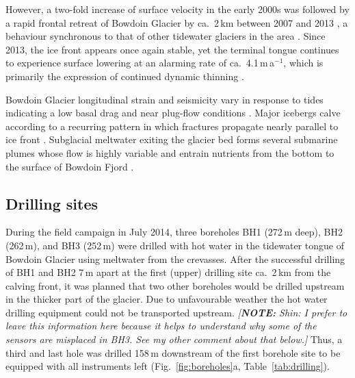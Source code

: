 \documentclass[utf8]{article}
\newcommand{\note}[1]{\textcolor{c0}{\emph{[\textbf{NOTE:} #1]}}}
\begin{document}
    However, a two-fold increase of surface velocity in the early 2000s was
    followed by a rapid frontal retreat of Bowdoin Glacier by ca.~2\,km between
    2007 and 2013 \citep[Fig.~2]{Sugiyama.etal.2015}, a behaviour synchronous
    to that of other tidewater glaciers in the area
    \citep{Sakakibara.Sugiyama.2018}. Since 2013, the ice front appears once
    again stable, yet the terminal tongue continues to experience surface
    lowering at an alarming rate of ca.~4.1\,m\,a$^{-1}$, which is primarily
    the expression of continued dynamic thinning \citep{Tsutaki.etal.2016}.

    Bowdoin Glacier longitudinal strain and seismicity vary in response to
    tides~\citep{Podolskiy.etal.2016, Podolskiy.etal.2017} indicating a low
    basal drag and near plug-flow conditions \citep{Seddik.etal.2019}. Major
    icebergs calve according to a recurring pattern in which fractures
    propagate nearly parallel to ice front \citep{Jouvet.etal.2017}. Subglacial
    meltwater exiting the glacier bed forms several submarine plumes whose flow
    is highly variable \citep{Jouvet.etal.2018} and entrain nutrients from the
    bottom to the surface of Bowdoin Fjord \citep{Kanna.etal.2018}.


\subsection{Drilling sites}

    During the field campaign in July 2014, three boreholes BH1 (272\,m deep),
    BH2 (262\,m), and BH3 (252\,m)
    were drilled with hot water in the tidewater tongue of Bowdoin Glacier
    using meltwater from the crevasses. After the successful drilling of BH1
    and BH2 7\,m apart at the first (upper) drilling site ca.~2\,km from the
    calving front, it was planned that two other boreholes would be drilled
    upstream in the thicker part of the glacier. Due to unfavourable weather the
    hot water drilling equipment could not be transported upstream.
    \note{Shin: I prefer to leave this information here because it helps to
          understand why some of the sensors are misplaced in BH3. See my other
          comment about that below.}
    Thus, a third
    and last hole was drilled 158\,m downstream of the first borehole site
    to be equipped with all instruments left (Fig.~\ref{fig:boreholes}a,
    Table~\ref{tab:drilling}).
\end{document}
